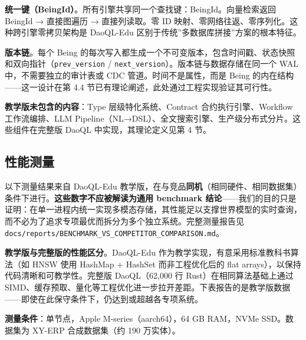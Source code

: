 \documentclass[11pt,a4paper]{ctexart}
\begin{document}
\textbf{统一键（BeingId）}。所有引擎共享同一个查找键：BeingId。向量检索返回
BeingId → 直接图遍历 → 直接列读取。零 ID
映射、零网络往返、零序列化。这种跨引擎零拷贝架构是 DaoQL-Edu
区别于传统''多数据库拼接''方案的根本特征。

\textbf{版本链}。每个 Being
的每次写入都生成一个不可变版本，包含时间戳、状态快照和双向指针（\texttt{prev\_version}
/ \texttt{next\_version}）。版本链与数据存储在同一个 WAL
中，不需要独立的审计表或 CDC 管道。时间不是属性，而是 Being
的内在结构------这一设计在第 4.4
节已有理论阐述，此处通过工程实现验证其可行性。

\textbf{教学版未包含的内容}：Type 层级特化系统、Contract
合约执行引擎、Workflow 工作流编排、LLM
Pipeline（NL→DSL）、全文搜索引擎、生产级分布式分片。这些组件在完整版
DaoQL 中实现，其理论定义见第 4 节。

\subsection{性能测量}\label{ux6027ux80fdux6d4bux91cf}

以下测量结果来自 DaoQL-Edu
教学版，在与竞品\textbf{同机}（相同硬件、相同数据集）条件下进行。\textbf{这些数字不应被解读为通用
benchmark
结论}------我们的目的只是证明：在单一进程内统一实现多模态存储，其性能足以支撑世界模型的实时查询，而不必为了追求专项最优而拆分为多个独立系统。完整测量报告见
\texttt{docs/reports/BENCHMARK\_VS\_COMPETITOR\_COMPARISON.md}。

\textbf{教学版与完整版的性能区分}。DaoQL-Edu
作为教学实现，有意采用标准教科书算法（如 HNSW 使用 HashMap + HashSet
而非工程优化后的 flat arrays），以保持代码清晰和可教学性。完整版
DaoQL（62,000 行 Rust）在相同算法基础上通过
SIMD、缓存预取、量化等工程优化进一步拉开差距。下表报告的是教学版数据------即使在此保守条件下，仍达到或超越各专项系统。

\textbf{测量条件}：单节点，Apple M-series（aarch64），64 GB RAM，NVMe
SSD。数据集为 XY-ERP 合成数据集（约 190 万实体）。
\end{document}

